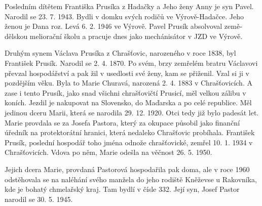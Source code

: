 \documentclass[../dejiny-rodu-prusiku.tex]{subfiles}
\begin{document}
Posledním dítětem Františka Prusíka z Hadačky a Jeho ženy Anny je syn Pavel. Narodil se 23. 7. 1943. Bydli v domku svých rodičů ve Výrově-Hadačce. Jeho ženou je Dana roz. Levá 6. 2. 1946 ve Výrově. Pavel Prusík absolvoval země­dělskou meliorační školu a pracuje dnes jako mechánisátor v JZD ve Výrově.

Druhým synem Václava Prusíka z Chrašťovic, naroze­ného v roce 1838, byl František Prusík. Narodil se 2. 4. 1870. Po svém, brzy zemřelém bratru Václavovi převzal hospodářství a pak žil v usedlosti své ženy, kam se přiženil. Vzal si ji v pozdějším věku. Byla to Marie Churavá, narozená 2. 4. 1883 v Chrašťovicích. A zase i tento Prusík, jako snad všichni chrašťovičtí Prusicí, měl velkou zálibu v koních. Jezdil je nakupovat na Slovensko, do Maďarska a po celé republice. Měl jedinou dceru Marii, která se narodila 29. 12. 1920. Otci tedy již bylo padesát let. Marie provdala se za Josefa Pastora, který za okupace působil jako finanční úředník na protektorátní hranici, která nedaleko Chrašťovic probíhala. František Prusík, poslední hospodář toho jména odnože chrašťovické, zemřel 10. 1. 1934 v Chrašťovicích. Vdova po něm, Marie odešla na věčnost 26. 5. 1950.

Jejich dcera Marie, provdaná Pastorová hospodařila pak doma, ale v roce 1960 odstěhovala se na naléhání své­ho manžela do jeho rodiště Kněževse u Rakovníka, kde je bohatý chmelařský kraj. Tam bydlí v čísle 332. Její syn, Josef Pastor narodil se 30. 5. 1945.
\end{document}
